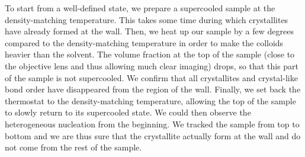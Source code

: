 To start from a well-defined state, we prepare a supercooled sample at the density-matching temperature. This takes some time during which crystallites have already formed at the wall. Then, we heat up our sample by a few degrees compared to the density-matching temperature in order to make the colloids heavier than the solvent. The volume fraction at the top of the sample (close to the objective lens and thus allowing much clear imaging) drops, so that this part of the sample is not supercooled. We confirm that all crystallites and crystal-like bond order have disappeared from the region of the wall. Finally, we set back the thermostat to the density-matching temperature, allowing the top of the sample to slowly return to its supercooled state. We could then observe the heterogeneous nucleation from the beginning. We tracked the sample from top to bottom and we are thus sure that the crystallite actually form at the wall and do not come from the rest of the sample.

